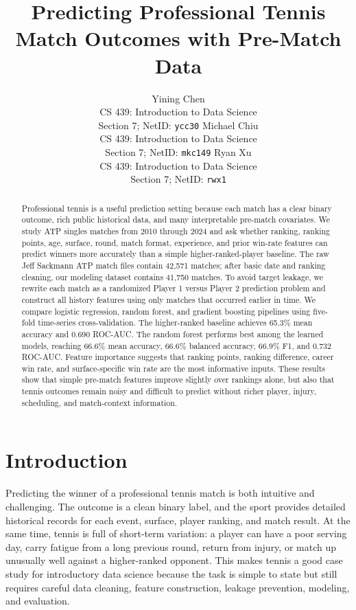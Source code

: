 \documentclass{article}
\title{Predicting Professional Tennis Match Outcomes with Pre-Match Data}
\author{%
  Yining Chen\\
  CS 439: Introduction to Data Science\\
  Section 7; NetID: \texttt{ycc30}
  \And
  Michael Chiu\\
  CS 439: Introduction to Data Science\\
  Section 7; NetID: \texttt{mkc149}
  \And
  Ryan Xu\\
  CS 439: Introduction to Data Science\\
  Section 7; NetID: \texttt{rwx1}
}
\begin{document}
\maketitle

\begin{abstract}
Professional tennis is a useful prediction setting because each match has a clear binary outcome, rich public historical data, and many interpretable pre-match covariates. We study ATP singles matches from 2010 through 2024 and ask whether ranking, ranking points, age, surface, round, match format, experience, and prior win-rate features can predict winners more accurately than a simple higher-ranked-player baseline. The raw Jeff Sackmann ATP match files contain 42,571 matches; after basic date and ranking cleaning, our modeling dataset contains 41,750 matches. To avoid target leakage, we rewrite each match as a randomized Player 1 versus Player 2 prediction problem and construct all history features using only matches that occurred earlier in time. We compare logistic regression, random forest, and gradient boosting pipelines using five-fold time-series cross-validation. The higher-ranked baseline achieves 65.3\% mean accuracy and 0.690 ROC-AUC. The random forest performs best among the learned models, reaching 66.6\% mean accuracy, 66.6\% balanced accuracy, 66.9\% F1, and 0.732 ROC-AUC. Feature importance suggests that ranking points, ranking difference, career win rate, and surface-specific win rate are the most informative inputs. These results show that simple pre-match features improve slightly over rankings alone, but also that tennis outcomes remain noisy and difficult to predict without richer player, injury, scheduling, and match-context information.
\end{abstract}

\section{Introduction}

Predicting the winner of a professional tennis match is both intuitive and challenging. The outcome is a clean binary label, and the sport provides detailed historical records for each event, surface, player ranking, and match result. At the same time, tennis is full of short-term variation: a player can have a poor serving day, carry fatigue from a long previous round, return from injury, or match up unusually well against a higher-ranked opponent. This makes tennis a good case study for introductory data science because the task is simple to state but still requires careful data cleaning, feature construction, leakage prevention, modeling, and evaluation.
\end{document}
